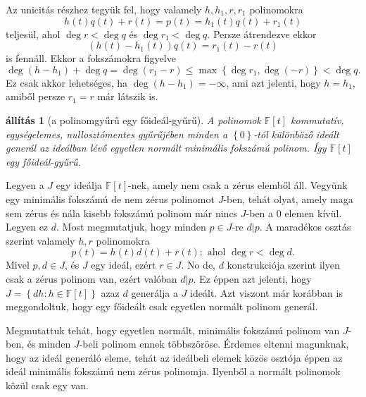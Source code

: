 \documentclass[a4paper, showtrims]{memoir}
\makeatletter
\renewenvironment{proof}[1][\proofname]
    {\par\pushQED{\qed}%
    \normalfont \topsep6\p@\@plus6\p@\relax
    \trivlist
    \item[\hskip\labelsep
        \itshape
    #1\@addpunct{:}]\ignorespaces}
    {\popQED\endtrivlist\@endpefalse}
\theoremstyle{plain}
\newtheorem{proposition}{állítás}[chapter]
\theoremstyle{remark}
\theoremstyle{definition}
\makeatother
\begin{document}
\begin{proof}
	Az unicitás részhez tegyük fel, hogy valamely $h,h_1,r,r_1$ polinomokra
	\[
		h\left( t \right)q\left( t \right)+r\left( t \right)
		=
		p\left( t \right)
		=
		h_1\left( t \right)q\left( t \right)+r_1\left( t \right)
	\]
	teljesül, ahol $\deg r<\deg q$ és $\deg r_1<\deg q$.
	Persze átrendezve ekkor
	\[
		\left( h\left( t \right)-h_1\left( t \right) \right)q\left( t \right)
		=
		r_1\left( t \right)-r\left( t \right)
	\]
	is fennáll.
	Ekkor a fokszámokra figyelve
	\[
		\deg\left( h-h_1 \right)+\deg q
		=
		\deg\left( r_1-r \right)
		\leq
		\max\left\{ \deg r_1,\deg (-r) \right\}
		<
		\deg q.
	\]
	Ez csak akkor lehetséges, ha $\deg\left( h-h_1 \right)=-\infty$,
	ami azt jelenti, hogy $h=h_1$,
	amiből persze $r_1=r$ már látszik is.
\end{proof}
\begin{proposition}[a polinomgyűrű egy főideál-gyűrű]\label{pr:pgyurufoidealgyuru}
	A polinomok $\mathbb{F}\left[ t \right]$ kommutatív, egységelemes, nullosztómentes gyűrűjében
	minden a $\left\{ 0 \right\}$-tól különböző ideált generál az ideálban lévő egyetlen normált minimális fokszámú polinom.
	Így $\mathbb{F}\left[ t \right]$ egy főideál-gyűrű.
\end{proposition}
\begin{proof}
	Legyen a $J$ egy ideálja $\mathbb{F}\left[ t \right]$-nek,
	amely nem csak a zérus elemből áll.
	Vegyünk egy minimális fokszámú de nem zérus polinomot $J$-ben,
	tehát olyat,
	amely maga sem zérus és nála kisebb fokszámú polinom már nincs $J$-ben a $0$ elemen kívül.
	Legyen ez $d$.
	Most megmutatjuk, hogy minden $p\in J$-re $d|p$.
	A maradékos osztás szerint
	valamely $h,r$ polinomokra
	\[
		p\left( t \right)=
		h\left( t \right)d\left( t \right)+r\left( t \right);
		\text{ ahol }
		\deg r<\deg d.
	\]
	Mivel $p,d\in J$, és $J$ egy ideál, ezért $r\in J$.
	No de, $d$ konstrukciója szerint ilyen csak a zérus polinom van,
	ezért valóban $d|p$.
	Ez éppen azt jelenti, hogy
	\(
	J=\left\{ dh:h\in\mathbb{F}\left[ t \right] \right\}
	\)
	azaz $d$ generálja a $J$ ideált.
	Azt viszont már korábban is meggondoltuk,
	hogy egy főideált csak egyetlen normált polinom generál.

	Megmutattuk tehát,
	hogy egyetlen normált, minimális fokszámú polinom van $J$-ben,
	és minden $J$-beli polinom ennek többszöröse.
\end{proof}
Érdemes eltenni magunknak, hogy az ideál generáló eleme, tehát az ideálbeli elemek közös osztója
éppen az ideál minimális fokszámú nem zérus polinomja.
Ilyenből a normált polinomok közül csak egy van.
\end{document}

